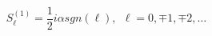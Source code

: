 \begin{equation}
S_{\ell}^{(1)} = \frac{1}{2}i\alpha sgn(\ell) , \ \ \ell = 0 , \mp 1,
\mp 2,\ldots
\end{equation}

